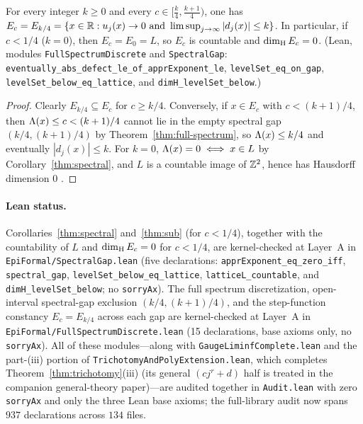 \begin{corollary}\label{thm:sub}
For every integer $k\ge0$ and every $c\in\bigl[\frac{k}{4},\frac{k+1}{4}\bigr)$,
one has $E_c=E_{k/4}=\{x\in\mathbb{R}:u_j(x)\to0\text{ and }\limsup_{j\to\infty}|d_j(x)|\le k\}$.
In particular, if $c<1/4$ ($k=0$), then $E_c=E_0=L$, so $E_c$ is countable and
$\dim_{\mathrm{H}} E_c=0$.
(Lean, modules \texttt{FullSpectrumDiscrete} and \texttt{SpectralGap}:
\texttt{eventually\_\allowbreak abs\_\allowbreak defect\_\allowbreak le\_\allowbreak of\_\allowbreak apprExponent\_\allowbreak le},
\texttt{levelSet\_\allowbreak eq\_\allowbreak on\_\allowbreak gap},
\texttt{levelSet\_\allowbreak below\_\allowbreak eq\_\allowbreak lattice}, and
\texttt{dimH\_\allowbreak levelSet\_\allowbreak below}.)
\end{corollary}

\begin{proof}
Clearly $E_{k/4}\subseteq E_c$ for $c\ge k/4$. Conversely, if $x\in E_c$ with
$c<(k+1)/4$, then $\Lambda(x)\le c<(k+1)/4$ cannot lie in the empty spectral gap
$(k/4,(k+1)/4)$ by Theorem~\ref{thm:full-spectrum}, so $\Lambda(x)\le k/4$ and
eventually $|d_j(x)|\le k$. For $k=0$, $\Lambda(x)=0\iff x\in L$ by
Corollary~\ref{thm:spectral}, and $L$ is a countable image of $\mathbb{Z}^2$, hence has
Hausdorff dimension $0$ \cite{Falconer}.
\end{proof}

\paragraph{Lean status.} Corollaries~\ref{thm:spectral} and~\ref{thm:sub} (for
$c<1/4$), together with the countability of $L$ and $\dim_{\mathrm{H}} E_c=0$ for $c<1/4$,
are kernel-checked at Layer~A in \texttt{EpiFormal/\allowbreak SpectralGap.lean}
(five declarations: \texttt{apprExponent\_eq\_zero\_iff},
\texttt{spectral\_gap}, \texttt{levelSet\_below\_eq\_lattice},
\texttt{latticeL\_countable}, and \texttt{dimH\_levelSet\_below}; no
\texttt{sorryAx}). The full spectrum discretization, open-interval spectral-gap
exclusion $(k/4,(k+1)/4)$, and the step-function constancy $E_c=E_{k/4}$ across
each gap are kernel-checked at Layer~A in
\texttt{EpiFormal/\allowbreak FullSpectrumDiscrete.lean} (15 declarations, base
axioms only, no \texttt{sorryAx}). All of these modules---along with
\texttt{Gauge\allowbreak Liminf\allowbreak Complete.lean} and the part-(iii)
portion of \texttt{Trichotomy\allowbreak And\allowbreak Poly\allowbreak Extension.lean},
which completes Theorem~\ref{thm:trichotomy}(iii) (its general $(cj^r+d)$ half
is treated in the companion general-theory paper)---are audited together in
\texttt{Audit.lean} with zero \texttt{sorryAx} and only the three Lean base
axioms; the full-library audit now spans $937$ declarations across $134$ files.

